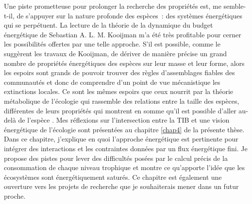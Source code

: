 Une piste prometteuse pour prolonger la recherche des propriétés est, me
semble-t-il, de s'appuyer sur la nature profonde des espèces~: des
systèmes énergétiques qui se perpétuent. La lecture de la théorie de la
dynamique du budget énergétique de Sebastian A. L. M. Kooijman
\citep{Kooijman2000a} m'a été très profitable pour cerner les
possibilités offertes par une telle approche. S'il est possible, comme
le suggèrent les travaux de Kooijman, de dériver de manière précise un
grand nombre de propriétés énergétiques des espèces sur leur masse et
leur forme, alors les espoirs sont grands de pouvoir trouver des règles
d'assemblages fiables des communautés et donc de comprendre d'un point
de vue mécanistique les extinctions locales. Ce sont les mêmes espoirs
que ceux nourrit par la théorie métabolique de l'écologie qui rassemble
des relations entre la taille des espèces, différentes de leurs
propriétés \citep{Brown2004} qui montrent en somme qu'il est possible
d'aller au-delà de l'espèce \citep{Poisot2015}. Mes réflexions sur
l'intersection entre la TIB et une vision énergétique de l'écologie sont
présentées au chapitre \ref{chap4} de la présente thèse. Dans ce
chapitre, j'explique en quoi l'approche énergétique est pertinente pour
intégrer des interactions et les contraintes données par un flux
énergétique fini. Je propose des pistes pour lever des difficultés
posées par le calcul précis de la consommation de chaque niveau
trophique et montre ce qu'apporte l'idée que les écosystèmes sont
énergétiquement saturés. Ce chapitre est également une ouverture vers
les projets de recherche que je souhaiterais mener dans un futur proche.
